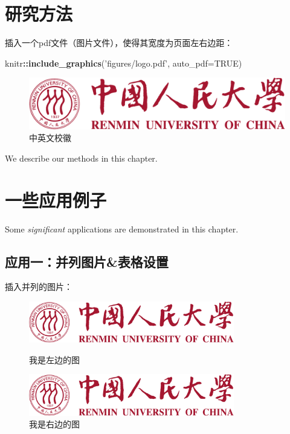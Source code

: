 \documentclass[a4paper,bachelor]{ructhesis}
\newenvironment{Shaded}{\begin{snugshade}}{\end{snugshade}}
\newcommand{\KeywordTok}[1]{\textcolor[rgb]{0.13,0.29,0.53}{\textbf{#1}}}
\newcommand{\DataTypeTok}[1]{\textcolor[rgb]{0.13,0.29,0.53}{#1}}
\newcommand{\StringTok}[1]{\textcolor[rgb]{0.31,0.60,0.02}{#1}}
\newcommand{\OtherTok}[1]{\textcolor[rgb]{0.56,0.35,0.01}{#1}}
\newcommand{\OperatorTok}[1]{\textcolor[rgb]{0.81,0.36,0.00}{\textbf{#1}}}
\newcommand{\NormalTok}[1]{#1}
\theoremstyle{definition}
\theoremstyle{definition}
\theoremstyle{definition}
\theoremstyle{remark}
\begin{document}
\chapter{研究方法}

插入一个pdf文件（图片文件），使得其宽度为页面左右边距：

\begin{Shaded}
\begin{Highlighting}[]
\NormalTok{knitr}\OperatorTok{::}\KeywordTok{include_graphics}\NormalTok{(}\StringTok{'figures/logo.pdf'}\NormalTok{, }\DataTypeTok{auto_pdf=}\OtherTok{TRUE}\NormalTok{)}
\end{Highlighting}
\end{Shaded}

\begin{figure}
\includegraphics[width=1\linewidth]{figures/logo} \caption{中英文校徽}\label{fig:unnamed-chunk-3}
\end{figure}

We describe our methods in this chapter.

\chapter{一些应用例子}

Some \emph{significant} applications are demonstrated in this chapter.

\section{应用一：并列图片\&表格设置}

插入并列的图片：

\begin{figure}

\begin{minipage}[t]{0.5\textwidth}
  \centering
  \includegraphics[width=0.8\textwidth]{figures/logo}
  \caption{我是左边的图}
\end{minipage}
\begin{minipage}[t]{0.5\textwidth}
  \centering
  \includegraphics[width=0.8\textwidth]{figures/logo}
  \caption{我是右边的图}
\end{minipage}

\end{figure}
\end{document}
